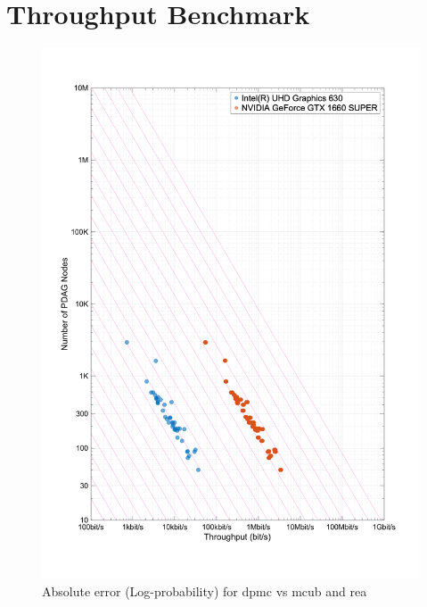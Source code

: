 \section{Throughput Benchmark}
\begin{figure}[p]
    \centering
    \includegraphics[width=1\textwidth]{figs/aralia/throughput_vs_nodes_by_device.png}
    \caption{Absolute error (Log-probability) for \acrfull{dpmc} vs \acrfull{mcub} and \acrfull{rea}}
    \label{fig:canopy_rel_error_plot_revies}
\end{figure}